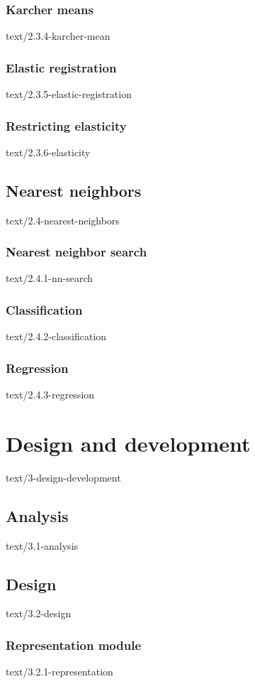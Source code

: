 \documentclass[epsbased,copyleft,final,extendedindex,firstnumbered,tfg, english]{tfgtfmthesisuam}
\begin{document}
  \subsection{Karcher means\label{SEC:KARCHER}}{text/2.3.4-karcher-mean}
  \subsection{Elastic registration\label{SEC:ELASTICREG}}{text/2.3.5-elastic-registration}
  \subsection{Restricting elasticity\label{SEC:RESTRICT}}{text/2.3.6-elasticity}

\section{Nearest neighbors\label{SEC:NEIGHBORS}}{text/2.4-nearest-neighbors}
  \subsection{Nearest neighbor search\label{SEC:SEARCH}}{text/2.4.1-nn-search}
  \subsection{Classification\label{SEC:SEARCH}}{text/2.4.2-classification}
  \subsection{Regression\label{SEC:SEARCH}}{text/2.4.3-regression}


\chapter{Design and development\label{CAP:DESIGNDEV}}{text/3-design-development}

\section{Analysis\label{SEC:ANALYSIS}}{text/3.1-analysis}
\section{Design\label{SEC:DESIGN}}{text/3.2-design}
  \subsection{Representation module\label{SEC:REPRMOD}}{text/3.2.1-representation}
\end{document}
